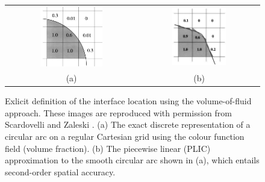 \begin{figure}[!h]
\begin{center}
\begin{tabular}{cc}
\hspace*{-1.0cm}
\includegraphics[width=0.5\textwidth]{plots/methodology/vof_basic.png} &
\hspace{-0.2cm}%
\includegraphics[width=0.473\textwidth]{plots/methodology/vof_plic.png} \\ 
\hspace{-0.2cm}%
(a) & (b) \\
\end{tabular}
\end{center}
\caption{ Exlicit definition of the interface location using the volume-of-fluid approach. 
These images are reproduced with permission from Scardovelli and Zaleski \cite{zaleskiannual}.
(a) The exact discrete representation of a circular arc on a regular Cartesian grid using the colour function field (volume fraction).
(b) The piecewise linear (PLIC) approximation to the smooth circular arc shown in (a), which entails second-order spatial accuracy.   
}
\label{vof_plic}
\end{figure}

